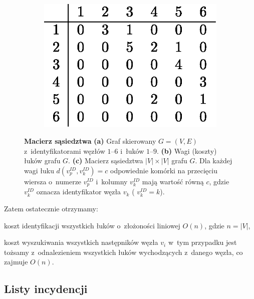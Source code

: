 \begin{figure}[!htbp]
\begin{subfigure}[b]{0.09\textwidth}
		\caption{}
	\end{subfigure}
	\qquad
	\begin{subfigure}[b]{0.35\textwidth}
		\includegraphics[width=\textwidth]{Chapter_I/2/1_2c.eps}
		\caption{}
	\end{subfigure}
	\caption{\textbf{Macierz sąsiedztwa} \textbf{(a)} Graf skierowany $G = \left( V, E \right)$ z~identyfikatorami węzłów $1$--$6$ i~łuków $1$--$9$. \textbf{(b)} Wagi (koszty) łuków grafu $G$. \textbf{(c)} Macierz sąsiedztwa $ \left| V \right| \times \left| V \right| $ grafu $G$. Dla każdej wagi łuku $ d \left( v_{p}^{ID}, v_{k}^{ID} \right) = c$ odpowiednie komórki na przecięciu wiersza o~numerze $v_{p}^{ID}$ i~kolumny $v_{k}^{ID}$ mają wartość równą $c$, gdzie $v_{k}^{ID}$ oznacza identyfikator węzła $v_{k}$ ( $v_{k}^{ID} = k$).}\label{fig:adjacencyMatrix}
\end{figure}

Zatem ostatecznie otrzymamy:

\begin{myitemize}
	\item koszt identyfikacji wszystkich łuków o~złożoności liniowej $O \left( n \right)$, gdzie $ n = \left| V \right| $,
	\item koszt wyszukiwania wszystkich następników węzła $v_{i}$ w~tym przypadku jest tożsamy z~odnalezieniem wszystkich łuków wychodzących z~danego węzła, co zajmuje $O \left( n \right)$.
\end{myitemize}

\subsection{Listy incydencji}

